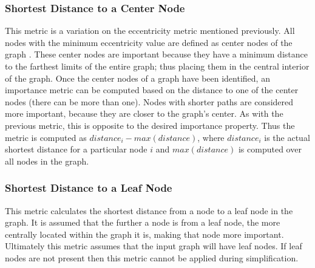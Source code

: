 \subsubsection{Shortest Distance to a Center Node}
This metric is a variation on the eccentricity metric mentioned previously.  All nodes with the minimum eccentricity value are defined as center nodes of the graph \cite{Har69}.  These center nodes are important because they have a minimum distance to the farthest limits of the entire graph; thus placing them in the central interior of the graph. Once the center nodes of a graph have been identified, an importance metric can be computed based on the distance to one of the center nodes (there can be more than one).  Nodes with shorter paths are considered more important, because they are closer to the graph's center.  As with the previous metric, this is opposite to the desired importance property. Thus the metric is computed as $distance_i - max(distance)$, where $distance_i$ is the actual shortest distance for a particular node $i$ and $max(distance)$ is computed over all nodes in the graph.



\subsubsection{Shortest Distance to a Leaf Node}
This metric calculates the shortest distance from a node to a leaf node in the graph.  It is assumed that the further a node is from a leaf node, the more centrally located within the graph it is, making that node more important.  Ultimately this metric assumes that the input graph will have leaf nodes.  If leaf nodes are not present then this metric cannot be applied during simplification.

